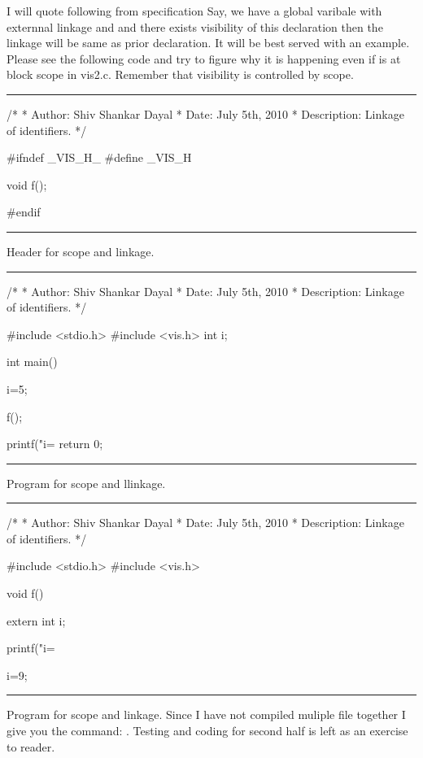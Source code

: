 I will quote following from specification 
Say, we have a global varibale with externnal linkage and and there
exists visibility of this declaration then the linkage will be same as
prior declaration. It will be best served with an example. Please see
the following code and try to figure why it is happening even if
 is at block scope in vis2.c. Remember that
visibility is controlled by scope.
\blank[force,1mm]\hrule\blank[force,1mm]
\startCPP
/*
 * Author: Shiv Shankar Dayal
 * Date: July 5th, 2010
 * Description: Linkage of identifiers.
 */

#ifndef _VIS_H_
#define _VIS_H

void f();

#endif
\stopCPP
{}
\hrule
\blank[force,1mm]
\startalignment[middle]
Header for scope and linkage.
\stopalignment
\blank[force,1mm]\hrule\blank[force,1mm]
\startCPP
/*
 * Author: Shiv Shankar Dayal
 * Date: July 5th, 2010
 * Description: Linkage of identifiers.
 */

#include <stdio.h>
#include <vis.h>
int i;

int main()
{
  i=5;

  f();

  printf("i=%
  return 0;
}	
\stopCPP
{}
\hrule
\blank[force,1mm]
\startalignment[middle]
Program for scope and llinkage.
\stopalignment
\blank[force,1mm]\hrule\blank[force,1mm]
\startCPP
/*
 * Author: Shiv Shankar Dayal
 * Date: July 5th, 2010
 * Description: Linkage of identifiers.
 */

#include <stdio.h>
#include <vis.h>

void f()
{
  extern int i;

  printf("i=%
	
  i=9;
}\stopCPP
{}
\hrule
\blank[force,1mm]
\startalignment[middle]
Program for scope and linkage.
\stopalignment
Since I have not compiled muliple file together I give you the
command: . Testing
and coding for second half is left as an exercise to reader.

